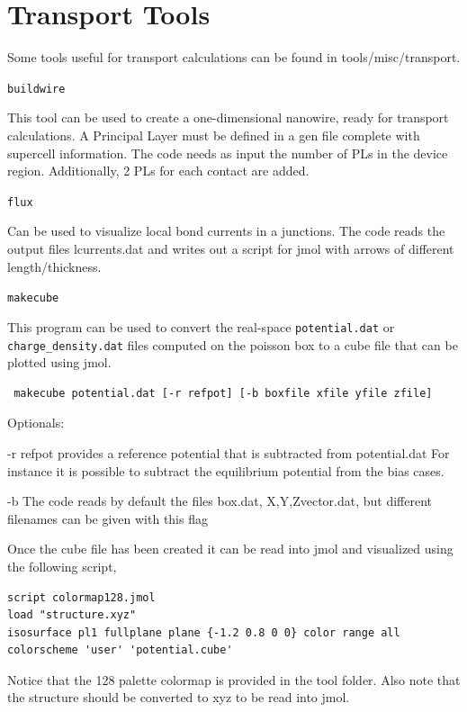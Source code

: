 \section{Transport Tools}

Some tools useful for transport calculations can be found in tools/misc/transport.

\verb|buildwire|

This tool can be used to create a one-dimensional nanowire, ready for transport 
calculations. A Principal Layer must be defined in a gen file complete with 
supercell information. 
The code needs as input the number of PLs in the device region. Additionally,
2 PLs for each contact are added.


\verb|flux|

Can be used to visualize local bond currents in a junctions. The code reads the
output files lcurrents.dat and writes out a script for jmol with arrows of
different length/thickness. 


\verb|makecube|

This program can be used to convert the real-space \verb|potential.dat| or
\verb|charge_density.dat| files computed on the poisson box to a cube file that
can be plotted using jmol.

\begin{verbatim}
 makecube potential.dat [-r refpot] [-b boxfile xfile yfile zfile]
\end{verbatim}

Optionals:

 -r  refpot provides a reference potential that is subtracted from potential.dat
     For instance it is possible to subtract the equilibrium potential from the
     bias cases.
 
 -b  The code reads by default the files box.dat, X,Y,Zvector.dat, but 
     different filenames can be given with this flag

Once the cube file has been created it can be read into jmol and visualized
using the following script,
\begin{verbatim}
script colormap128.jmol
load "structure.xyz"
isosurface pl1 fullplane plane {-1.2 0.8 0 0} color range all colorscheme 'user' 'potential.cube'
\end{verbatim}

Notice that the 128 palette colormap is provided in the tool folder.
Also note that the structure should be converted to xyz to be read into jmol.


